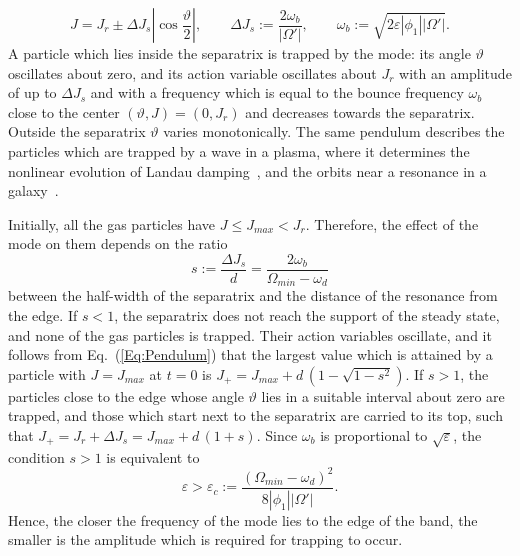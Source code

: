 \begin{equation}
J = J_r\pm \Delta J_s\left| \cos\frac{\vartheta}{2} \right|,\qquad
\Delta J_s := \frac{2\omega_b}{|\Omega'|},\qquad
\omega_b := \sqrt{2\varepsilon |\phi_1| |\Omega'|}.
\label{Eq:Separatrix}
\end{equation}
A particle which lies inside the separatrix is trapped by the mode: its angle $\vartheta$ oscillates about zero, and its action variable oscillates about $J_r$ with an amplitude of up to $\Delta J_s$ and with a frequency which is equal to the bounce frequency $\omega_b$ close to the center $(\vartheta,J) = (0,J_r)$ and decreases towards the separatrix. Outside the separatrix $\vartheta$ varies monotonically. The same pendulum describes the particles which are trapped by a wave in a plasma, where it determines the nonlinear evolution of Landau damping~\cite{tO65}, and the orbits near a resonance in a galaxy~\cite{BinneyTremaine-Book}.

Initially, all the gas particles have $J\leq J_{max} < J_r$. Therefore, the effect of the mode on them depends on the ratio
\begin{equation}
s := \frac{\Delta J_s}{d} = \frac{2\omega_b}{\Omega_{min} - \omega_d}
\label{Eq:sDef}
\end{equation}
between the half-width of the separatrix and the distance of the resonance from the edge. If $s < 1$, the separatrix does not reach the support of the steady state, and none of the gas particles is trapped. Their action variables oscillate, and it follows from Eq.~(\ref{Eq:Pendulum}) that the largest value which is attained by a particle with $J = J_{max}$ at $t = 0$ is $J_+ = J_{max} + d\,( 1 - \sqrt{1 - s^2} )$. If $s > 1$, the particles close to the edge whose angle $\vartheta$ lies in a suitable interval about zero are trapped, and those which start next to the separatrix are carried to its top, such that $J_+ = J_r + \Delta J_s = J_{max} + d\,(1 + s)$. Since $\omega_b$ is proportional to $\sqrt{\varepsilon}$, the condition $s > 1$ is equivalent to
\begin{equation}
\varepsilon > \varepsilon_c := \frac{(\Omega_{min} - \omega_d)^2}{8 |\phi_1| |\Omega'|}.
\label{Eq:epsc}
\end{equation}
Hence, the closer the frequency of the mode lies to the edge of the band, the smaller is the amplitude which is required for trapping to occur.

